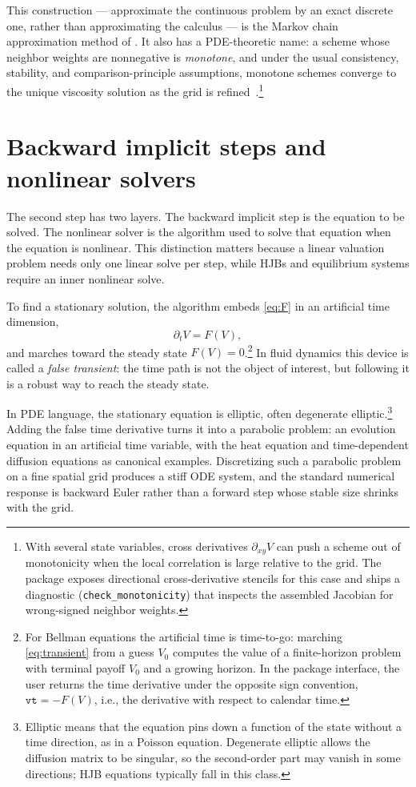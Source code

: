 \documentclass[11pt]{article}
\numberwithin{equation}{section}
\begin{document}
	This construction --- approximate the continuous problem by an exact discrete one, rather than approximating the calculus --- is the Markov chain approximation method of \citet{kushner2001numerical}. It also has a PDE-theoretic name: a scheme whose neighbor weights are nonnegative is \emph{monotone}, and under the usual consistency, stability, and comparison-principle assumptions, monotone schemes converge to the unique viscosity solution as the grid is refined~\citep{barles1991convergence}.\footnote{With several state variables, cross derivatives $\partial_{xy}V$ can push a scheme out of monotonicity when the local correlation is large relative to the grid. The package exposes directional cross-derivative stencils for this case and ships a diagnostic (\texttt{check\_monotonicity}) that inspects the assembled Jacobian for wrong-signed neighbor weights.}

		\section{Backward implicit steps and nonlinear solvers}\label{sec:implicit}

		The second step has two layers. The backward implicit step is the equation to be solved. The nonlinear solver is the algorithm used to solve that equation when the equation is nonlinear. This distinction matters because a linear valuation problem needs only one linear solve per step, while HJBs and equilibrium systems require an inner nonlinear solve.

		To find a stationary solution, the algorithm embeds \eqref{eq:F} in an artificial time dimension,
		\begin{equation}\label{eq:transient}
			\partial_t V = F(V),
		\end{equation}
	and marches toward the steady state $F(V) = 0$.\footnote{For Bellman equations the artificial time is time-to-go: marching \eqref{eq:transient} from a guess $V_0$ computes the value of a finite-horizon problem with terminal payoff $V_0$ and a growing horizon. In the package interface, the user returns the time derivative under the opposite sign convention, $\texttt{vt} = -F(V)$, i.e., the derivative with respect to calendar time.} In fluid dynamics this device is called a \emph{false transient}: the time path is not the object of interest, but following it is a robust way to reach the steady state.

	In PDE language, the stationary equation is elliptic, often degenerate elliptic.\footnote{Elliptic means that the equation pins down a function of the state without a time direction, as in a Poisson equation. Degenerate elliptic allows the diffusion matrix to be singular, so the second-order part may vanish in some directions; HJB equations typically fall in this class.} Adding the false time derivative turns it into a parabolic problem: an evolution equation in an artificial time variable, with the heat equation and time-dependent diffusion equations as canonical examples. Discretizing such a parabolic problem on a fine spatial grid produces a stiff ODE system, and the standard numerical response is backward Euler rather than a forward step whose stable size shrinks with the grid.
\end{document}
